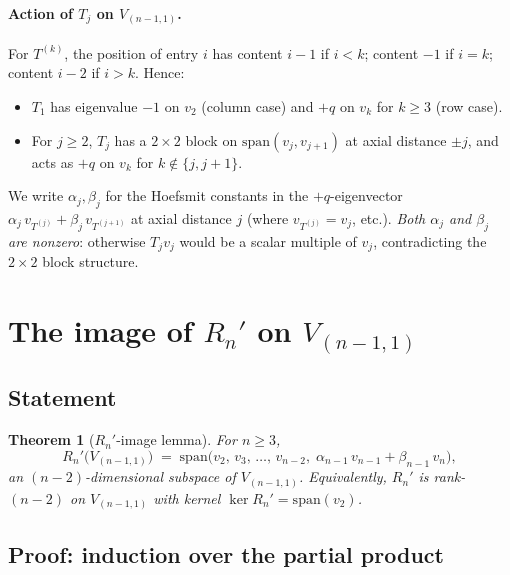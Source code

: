 \documentclass[11pt]{article}
\newtheorem{theorem}{Theorem}
\theoremstyle{definition}
\begin{document}
\paragraph{Action of $T_j$ on $V_{(n-1,1)}$.}
For $T^{(k)}$, the position of entry $i$ has content $i-1$ if $i < k$;
content $-1$ if $i = k$; content $i-2$ if $i > k$. Hence:
\begin{itemize}[topsep=0.3em,itemsep=0.2em,leftmargin=2em]
\item $T_1$ has eigenvalue $-1$ on $v_2$ (column case) and $+q$ on
  $v_k$ for $k \ge 3$ (row case).
\item For $j \ge 2$, $T_j$ has a $2{\times}2$ block on
  $\mathrm{span}(v_{j}, v_{j+1})$ at axial distance $\pm j$, and acts as
  $+q$ on $v_k$ for $k \notin \{j, j{+}1\}$.
\end{itemize}
We write $\alpha_j, \beta_j$ for the Hoefsmit constants in the $+q$-eigenvector
$\alpha_j\, v_{T^{(j)}} + \beta_j\, v_{T^{(j+1)}}$ at axial distance $j$
(where $v_{T^{(j)}} = v_j$, etc.).
\emph{Both $\alpha_j$ and $\beta_j$ are nonzero}: otherwise $T_j v_j$
would be a scalar multiple of $v_j$, contradicting the $2{\times}2$
block structure.

\section{The image of $R_n'$ on $V_{(n-1,1)}$}\label{sec:Rn-image}

\subsection{Statement}

\begin{theorem}[$R_n'$-image lemma]\label{thm:Rn-image}
For $n \ge 3$,
\begin{equation}\label{eq:Rn-image}
   R_n'\bigl(V_{(n-1,1)}\bigr) \;=\;
   \mathrm{span}\bigl(v_2,\,v_3,\,\ldots,\,v_{n-2},\;
                      \alpha_{n-1}\, v_{n-1} + \beta_{n-1}\, v_n\bigr),
\end{equation}
an $(n{-}2)$-dimensional subspace of $V_{(n-1,1)}$. Equivalently,
$R_n'$ is rank-$(n-2)$ on $V_{(n-1,1)}$ with kernel
$\ker R_n' = \mathrm{span}(v_2)$.
\end{theorem}

\subsection{Proof: induction over the partial product}
\end{document}

